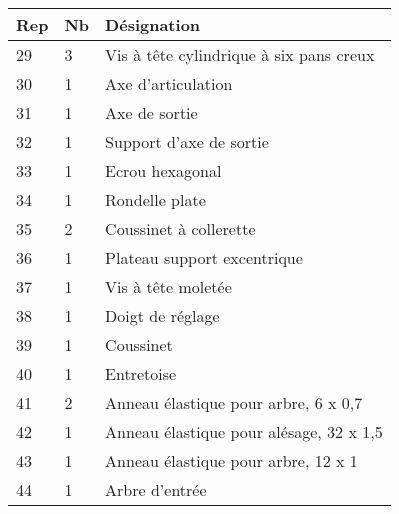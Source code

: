 \begin{multicols}{2}
\begin{center}
\begin{tabular}{|l|l|l|}
\hline
Rep & Nb  & Désignation \\ \hline \hline %
29&
3&
Vis à tête cylindrique à six pans creux \\ \hline %
30&
1&
Axe d'articulation \\ \hline %
31&
1&
Axe de sortie \\ \hline %
32&
1&
Support d'axe de sortie \\ \hline %
33&
1&
Ecrou hexagonal \\ \hline %
34&
1&
Rondelle plate \\ \hline %
35&
2&
Coussinet à collerette \\ \hline %
36&
1&
Plateau support excentrique \\ \hline %
37&
1&
Vis à tête moletée \\ \hline %
38&
1&
Doigt de réglage \\ \hline %
39&
1&
Coussinet \\ \hline %
40&
1&
Entretoise  \\ \hline 
41&
2&
Anneau élastique pour arbre, 6 x 0,7  \\ \hline %
42&
1&
Anneau élastique pour alésage, 32 x 1,5 \\ \hline %
43&
1&
Anneau élastique pour arbre, 12 x 1 \\ \hline %
44&
1&
Arbre d’entrée \\ \hline %

\end{tabular}
\end{center}
\end{multicols}
